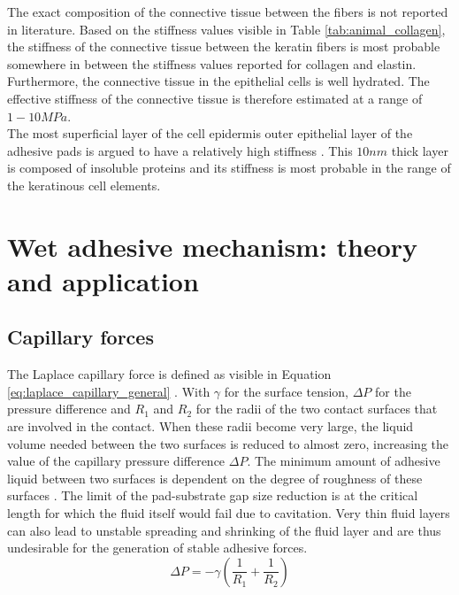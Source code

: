 \qquad The exact composition of the connective tissue between the fibers is not reported in literature. Based on the stiffness values visible in Table \ref{tab:animal_collagen}, the stiffness of the connective tissue between the keratin fibers is most probable somewhere in between the stiffness values reported for collagen and elastin. Furthermore, the connective tissue in the epithelial cells is well hydrated. The effective stiffness of the connective tissue is therefore estimated at a range of $1-10 MPa$.\\

\qquad The most superficial layer of the cell epidermis outer epithelial layer of the adhesive pads is argued to have a relatively high stiffness \cite{nakano2016light}. This $10 nm$ thick layer is composed of insoluble proteins and its stiffness is most probable in the range of the keratinous cell elements.\\







\section{Wet adhesive mechanism: theory and application}\label{sec:adhesive_theories}
\subsection{Capillary forces}
The Laplace capillary force is defined as visible in Equation \ref{eq:laplace_capillary_general} \cite{laplace1799traite}. With $\gamma$ for the surface tension, $\Delta P$ for the pressure difference and $R_1$ and $R_2$ for the radii of the two contact surfaces that are involved in the contact. When these radii become very large, the liquid volume needed between the two surfaces is reduced to almost zero, increasing the value of the capillary pressure difference $\Delta P$. The minimum amount of adhesive liquid between two surfaces is dependent on the degree of roughness of these surfaces \cite{qian2006scaling}. The limit of the pad-substrate gap size reduction is at the critical length for which the fluid itself would fail due to cavitation. Very thin fluid layers can also lead to unstable spreading and shrinking of the fluid layer \cite{yi2009dynamic} and are thus undesirable for the generation of stable adhesive forces.\\ 
\begin{equation}
    \Delta P = - \gamma (\frac{1}{R_1} + \frac{1}{R_2})
    \label{eq:laplace_capillary_general}
\end{equation}

